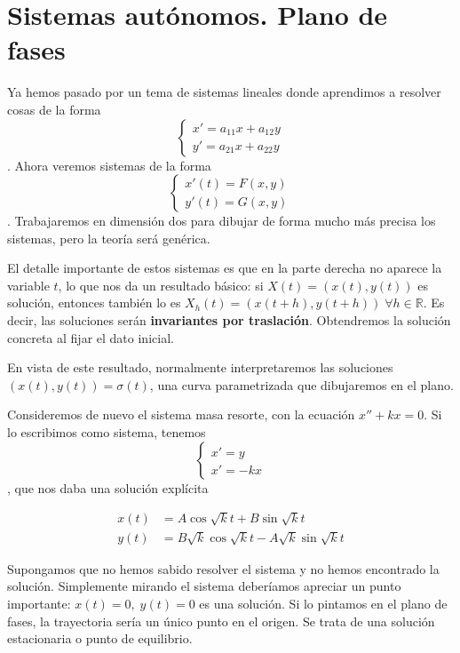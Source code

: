 \newcommand{\sist}[2]{\[ \left\{\begin{array}{rcl} x' &=& #1 \\ y' &=& #2 \end{array}\right. \]}

\section{Sistemas autónomos. Plano de fases}

Ya hemos pasado por un tema de sistemas lineales donde aprendimos a resolver cosas de la forma \[ \begin{cases}x'= a_{11}x + a_{12}y \\ y'=a_{21}x + a_{22}y \end{cases} \]. Ahora veremos sistemas de la forma \[ \begin{cases} x'(t) = F(x,y) \\ y'(t) = G(x,y) \end{cases} \]. Trabajaremos en dimensión dos para dibujar de forma mucho más precisa los sistemas, pero la teoría será genérica.

El detalle importante de estos sistemas es que en la parte derecha no aparece la variable $t$, lo que nos da un resultado básico: si $X(t) = (x(t), y(t))$ es solución, entonces también lo es $X_h(t) = (x(t+h), y(t+h))\; ∀h∈ℝ$. Es decir, las soluciones serán \textbf{invariantes por traslación}. Obtendremos la solución concreta al fijar el dato inicial.

En vista de este resultado, normalmente interpretaremos las soluciones $(x(t), y(t)) = σ(t)$, una curva parametrizada que dibujaremos en el plano.

Consideremos de nuevo el sistema masa resorte, con la ecuación $x'' +kx = 0$. Si lo escribimos como sistema, tenemos \[ \begin{cases} x' = y \\ x' = -kx \end{cases} \], que nos daba una solución explícita 

\begin{align*}
x(t) &= A\cos \sqrt{k}t + B \sin \sqrt{k} t \\
y(t) &= B\sqrt{k}\cos \sqrt{k} t - A \sqrt{k}\sin \sqrt{k} t
\end{align*}

Supongamos que no hemos sabido resolver el sistema y no hemos encontrado la solución. Simplemente mirando el sistema deberíamos apreciar un punto importante: $x(t) = 0,\;y(t) = 0$ es una solución. Si lo pintamos en el plano de fases, la trayectoria sería un único punto en el origen. Se trata de una solución estacionaria o punto de equilibrio.

